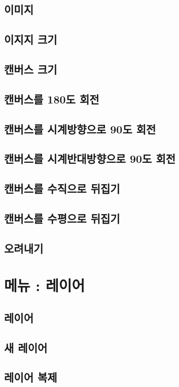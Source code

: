 \documentclass[12pt, a4paper, oneside]{book}
\let\stdsection\section
\renewcommand\section{\newpage\stdsection}
\begin{document}
\section{	이미지	}										
\section{	이지지 크기				}							
\section{	캔버스 크기				}							
\section{	캔버스를 180도 회전				}							
\section{	캔버스를 시계방향으로 90도 회전				}							
\section{	캔버스를 시계반대방향으로 90도 회전				}							
\section{	캔버스를 수직으로 뒤집기				}							
\section{	캔버스를 수평으로 뒤집기				}							
\section{	오려내기				}							



	\chapter{메뉴 : 레이어} 
	\minitoc
\section{	레이어	}										
\section{	새 레이어				}							
\section{	레이어 복제				}							
\end{document}
